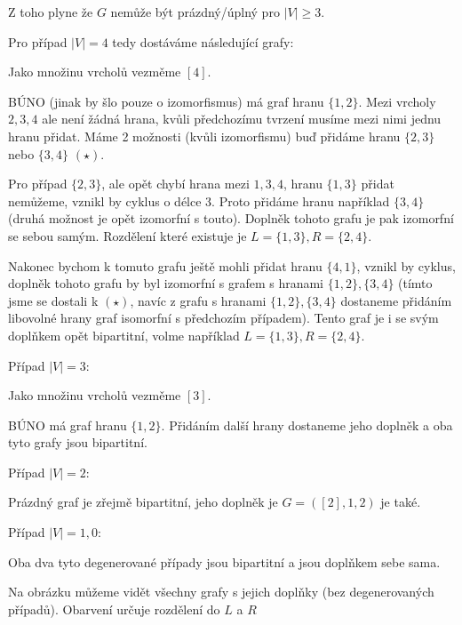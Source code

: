 \documentclass[../main.tex]{subfiles}
\begin{document}
Z toho plyne že $G$ nemůže být prázdný/úplný pro $|V|\geq 3$.

Pro případ $|V| = 4$ tedy dostáváme následující grafy:

Jako množinu vrcholů vezměme $[4]$. 

BÚNO (jinak by šlo pouze o izomorfismus) má graf  hranu $\{1,2\}$. 
Mezi vrcholy $2,3,4$ ale není žádná hrana, kvůli předchozímu tvrzení musíme mezi nimi jednu hranu přidat.
Máme 2 možnosti (kvůli izomorfismu) buď přidáme hranu $\{2,3\}$ nebo $\{3,4\}$  $(\star)$.

Pro případ $\{2,3\}$, ale opět chybí hrana mezi $1,3,4$, hranu $\{1,3\}$ přidat nemůžeme, vznikl by cyklus o délce 3. Proto přidáme 
hranu například $\{3,4\}$ (druhá možnost je opět izomorfní s touto). Doplněk tohoto grafu je pak izomorfní se sebou samým. Rozdělení které existuje je $L = \{1,3\}, R = \{2,4\}$.

Nakonec bychom k tomuto grafu ještě mohli přidat hranu $\{4,1\}$, vznikl by cyklus, doplněk tohoto grafu by byl izomorfní s grafem s hranami  $\{1,2\}, \{3,4\}$ (tímto jsme se dostali k $(\star)$, navíc z grafu s hranami $\{1,2\}, \{3,4\}$ dostaneme přidáním libovolné hrany graf isomorfní s předchozím případem).
Tento graf je i se svým doplňkem opět bipartitní, volme například $L = \{1,3\}, R = \{2,4\}$.


Případ $|V| = 3$:

Jako množinu vrcholů vezměme $[3]$. 

BÚNO má graf  hranu $\{1,2\}$. Přidáním další hrany dostaneme jeho doplněk a oba tyto grafy jsou bipartitní.

Případ $|V| = 2$:

Prázdný graf je zřejmě bipartitní, jeho doplněk je $G=([2], {1,2})$ je také.

Případ $|V| = 1,0$:

Oba dva tyto degenerované případy jsou bipartitní a jsou doplňkem sebe sama. 

Na obrázku můžeme vidět všechny grafy s jejich doplňky (bez degenerovaných případů). 
Obarvení určuje rozdělení do $L$ a $R$
\end{document}
